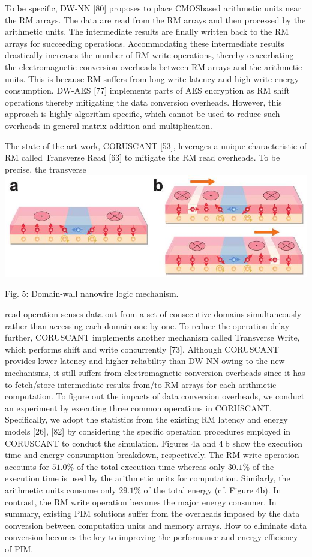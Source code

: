 \documentclass[10pt]{article}
\begin{document}
To be specific, DW-NN [80] proposes to place CMOSbased arithmetic units near the RM arrays. The data are read from the RM arrays and then processed by the arithmetic units. The intermediate results are finally written back to the RM arrays for succeeding operations. Accommodating these intermediate results drastically increases the number of RM write operations, thereby exacerbating the electromagnetic conversion overheads between RM arrays and the arithmetic units. This is because RM suffers from long write latency and high write energy consumption. DW-AES [77] implements parts of AES encryption as RM shift operations thereby mitigating the data conversion overheads. However, this approach is highly algorithm-specific, which cannot be used to reduce such overheads in general matrix addition and multiplication.

The state-of-the-art work, CORUSCANT [53], leverages a unique characteristic of RM called Transverse Read [63] to mitigate the RM read overheads. To be precise, the transverse\\
\includegraphics[max width=\textwidth, center]{2024_05_12_abeba8a85da5b5ec4c7bg-04(1)}

Fig. 5: Domain-wall nanowire logic mechanism.

read operation senses data out from a set of consecutive domains simultaneously rather than accessing each domain one by one. To reduce the operation delay further, CORUSCANT implements another mechanism called Transverse Write, which performs shift and write concurrently [73]. Although CORUSCANT provides lower latency and higher reliability than DW-NN owing to the new mechanisms, it still suffers from electromagnetic conversion overheads since it has to fetch/store intermediate results from/to RM arrays for each arithmetic computation. To figure out the impacts of data conversion overheads, we conduct an experiment by executing three common operations in CORUSCANT. Specifically, we adopt the statistics from the existing RM latency and energy models [26], [82] by considering the specific operation procedures employed in CORUSCANT to conduct the simulation. Figures $4 \mathrm{a}$ and $4 \mathrm{~b}$ show the execution time and energy consumption breakdown, respectively. The RM write operation accounts for $51.0 \%$ of the total execution time whereas only $30.1 \%$ of the execution time is used by the arithmetic units for computation. Similarly, the arithmetic units consume only $29.1 \%$ of the total energy (cf. Figure 4b). In contrast, the RM write operation becomes the major energy consumer. In summary, existing PIM solutions suffer from the overheads imposed by the data conversion between computation units and memory arrays. How to eliminate data conversion becomes the key to improving the performance and energy efficiency of PIM.
\end{document}
